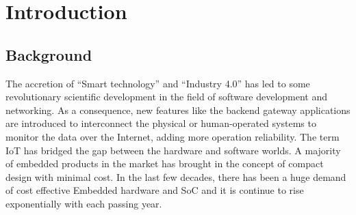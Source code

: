 
\chapter{Introduction} %

\label{chapter:introduction}


\newcommand{\keyword}[1]{\textbf{#1}}
\newcommand{\tabhead}[1]{\textbf{#1}}
\newcommand{\code}[1]{\texttt{#1}}
\newcommand{\file}[1]{\texttt{\bfseries#1}}
\newcommand{\option}[1]{\texttt{\itshape#1}}

\section{Background}
The accretion of \enquote{Smart technology} and \enquote{Industry 4.0} has led to some revolutionary scientific development in the field of software development and networking. As a consequence, new features like the backend gateway applications are introduced to interconnect the physical or human-operated systems to monitor the data over the Internet, adding more operation reliability. The term \ac{IoT} has bridged the gap between the hardware and software worlds. A majority of embedded products in the market has brought in the concept of compact design with minimal cost. In the last few decades, there has been a huge demand of cost effective Embedded hardware and \ac{SoC} and it is continue to rise exponentially with each passing year. 

